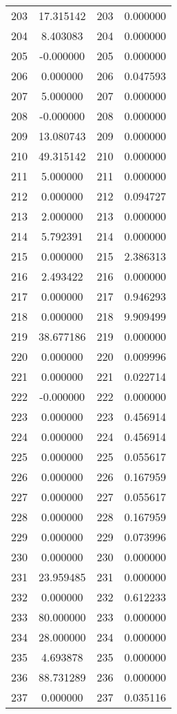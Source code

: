 \documentclass[12pt]{article}
\begin{document}
\begin{longtable}{@{}cccc@{}}
203 & 17.315142 & 203 & 0.000000 \\
204 & 8.403083 & 204 & 0.000000 \\
205 & -0.000000 & 205 & 0.000000 \\
206 & 0.000000 & 206 & 0.047593 \\
207 & 5.000000 & 207 & 0.000000 \\
208 & -0.000000 & 208 & 0.000000 \\
209 & 13.080743 & 209 & 0.000000 \\
210 & 49.315142 & 210 & 0.000000 \\
211 & 5.000000 & 211 & 0.000000 \\
212 & 0.000000 & 212 & 0.094727 \\
213 & 2.000000 & 213 & 0.000000 \\
214 & 5.792391 & 214 & 0.000000 \\
215 & 0.000000 & 215 & 2.386313 \\
216 & 2.493422 & 216 & 0.000000 \\
217 & 0.000000 & 217 & 0.946293 \\
218 & 0.000000 & 218 & 9.909499 \\
219 & 38.677186 & 219 & 0.000000 \\
220 & 0.000000 & 220 & 0.009996 \\
221 & 0.000000 & 221 & 0.022714 \\
222 & -0.000000 & 222 & 0.000000 \\
223 & 0.000000 & 223 & 0.456914 \\
224 & 0.000000 & 224 & 0.456914 \\
225 & 0.000000 & 225 & 0.055617 \\
226 & 0.000000 & 226 & 0.167959 \\
227 & 0.000000 & 227 & 0.055617 \\
228 & 0.000000 & 228 & 0.167959 \\
229 & 0.000000 & 229 & 0.073996 \\
230 & 0.000000 & 230 & 0.000000 \\
231 & 23.959485 & 231 & 0.000000 \\
232 & 0.000000 & 232 & 0.612233 \\
233 & 80.000000 & 233 & 0.000000 \\
234 & 28.000000 & 234 & 0.000000 \\
235 & 4.693878 & 235 & 0.000000 \\
236 & 88.731289 & 236 & 0.000000 \\
237 & 0.000000 & 237 & 0.035116 \\

\end{longtable}
\end{document}

